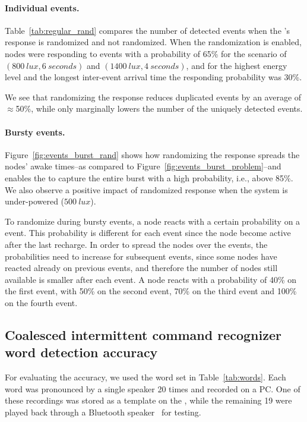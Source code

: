 \paragraph{Individual events.} 
Table~\ref{tab:regular_rand} compares the number of detected events when the \cim's response is randomized and not randomized.
When the randomization is enabled, nodes were responding to events with a probability of 65\% for the scenario of $\left(\SI{800}{lux}, \SI{6}{seconds}\right)$ and $\left(\SI{1400}{lux}, \SI{4}{seconds}\right)$, and for the highest energy level and the longest inter-event arrival time the responding probability was 30\%.

We see that randomizing the response reduces duplicated events by an average of $\approx$50\%, while only marginally lowers the number of the uniquely detected events. 

\paragraph{Bursty events.}
Figure~\ref{fig:events_burst_rand} shows how randomizing the \cis response spreads the nodes' awake times--as compared to Figure~\ref{fig:events_burst_problem}--and enables the \cis to capture the entire burst with a high probability, i.e., above 85\%. We also observe a positive impact of randomized response when the system is under-powered ($\SI{500}{lux}$).

To randomize during bursty events, a node reacts with a certain probability on a event. This probability is different for each event since the node become active after the last recharge. In order to spread the nodes over the events, the probabilities need to increase for subsequent events, since some nodes have reacted already on previous events, and therefore the number of nodes still available is smaller after each event.
A node reacts with a probability of 40\% on the first event, with 50\% on the second event, 70\% on the third event and 100\% on the fourth event.


\subsection{Coalesced intermittent command recognizer word detection accuracy}
For evaluating the \fullcim accuracy, we used the word set in Table~\ref{tab:words}.
Each word was pronounced by a single speaker 20 times and recorded on a PC. One of these recordings was stored as a template on the \cim, while the remaining 19 were played back through a Bluetooth speaker~\cite{microphone} for testing.


